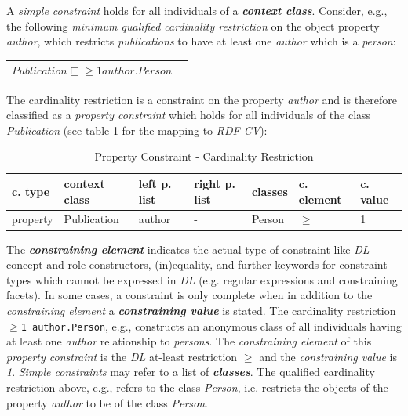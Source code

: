 \documentclass{llncs}
\newcommand{\ms}[1]{\texttt{#1}}
\newenvironment{DL}{
  \vspace{0cm}
	\begin{center}
  \begin{tabular}{r l}

}{
  \end{tabular}
	\end{center}
}
\begin{document}
A \emph{simple constraint} holds for all individuals of a \textbf{\emph{context class}}.
Consider, e.g., the following \emph{minimum qualified cardinality restriction} on the object property \emph{author}, which restricts \emph{publications} to have at least one \emph{author} which is a \emph{person}: 
\begin{DL}
$Publication \sqsubseteq \geq1 author . Person $
\end{DL}
The cardinality restriction is a constraint on the property \emph{author} and is therefore classified as a \emph{property constraint} which holds for all individuals of the class \emph{Publication} (see table \ref{tab:property-constraint-cardinality-restriction} for the mapping to \emph{RDF-CV}):

\begin{table}
  \scriptsize
  \sffamily
  \vspace{0cm}
	\centering
		\begin{tabular}{l|l|l|l|l|l|l}
      \textbf{c. type} & \textbf{context class} & \textbf{left p. list} & \textbf{right p. list} & \textbf{classes} & \textbf{c. element} & \textbf{c. value} \\
      \hline
      property & Publication & author & - & Person & $\geq$ & 1 \\
		\end{tabular}
	\caption{Property Constraint - Cardinality Restriction}
	\label{tab:property-constraint-cardinality-restriction}
\end{table}

The \textbf{\emph{constraining element}} indicates the actual type of constraint like \emph{DL} concept and role constructors, (in)equality, and further keywords for constraint types which cannot be expressed in \emph{DL} (e.g. regular expressions and constraining facets).
In some cases, a constraint is only complete when in addition to the \emph{constraining element} a \textbf{\emph{constraining value}} is stated.
The cardinality restriction 
\ms{$\geq$1 author.Person}, e.g., 
constructs an anonymous class of all individuals having at least one \emph{author} relationship to \emph{persons}.
The \emph{constraining element} of this \emph{property constraint} is the \emph{DL} at-least restriction \emph{$\geq$} and the \emph{constraining value} is \emph{1}.
\emph{Simple constraints} may refer to a list of \textbf{\emph{classes}}.
The qualified cardinality restriction above, e.g., refers to the class \emph{Person}, 
i.e. restricts the objects of the property \emph{author} to be of the class \emph{Person}.
\end{document}
